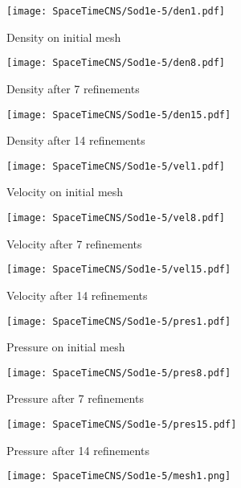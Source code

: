 \documentclass[Proposal.tex]{subfiles}
\begin{document}
\begin{figure}[p]
\centering
\begin{subfigure}[c]{0.3\textwidth}
\centering
\texttt{[image: SpaceTimeCNS/Sod1e-5/den1.pdf]}
\caption{Density on initial mesh}
\label{fig:sod_den0}
\end{subfigure}
\begin{subfigure}[c]{0.3\textwidth}
\centering
\texttt{[image: SpaceTimeCNS/Sod1e-5/den8.pdf]}
\caption{Density after 7 refinements}
\label{fig:sod_den7}
\end{subfigure}
\begin{subfigure}[c]{0.3\textwidth}
\centering
\texttt{[image: SpaceTimeCNS/Sod1e-5/den15.pdf]}
\caption{Density after 14 refinements}
\label{fig:sod_den14}
\end{subfigure}
\begin{subfigure}[c]{0.3\textwidth}
\centering
\texttt{[image: SpaceTimeCNS/Sod1e-5/vel1.pdf]}
\caption{Velocity on initial mesh}
\label{fig:sod_vel0}
\end{subfigure}
\begin{subfigure}[c]{0.3\textwidth}
\centering
\texttt{[image: SpaceTimeCNS/Sod1e-5/vel8.pdf]}
\caption{Velocity after 7 refinements}
\label{fig:sod_vel7}
\end{subfigure}
\begin{subfigure}[c]{0.3\textwidth}
\centering
\texttt{[image: SpaceTimeCNS/Sod1e-5/vel15.pdf]}
\caption{Velocity after 14 refinements}
\label{fig:sod_vel14}
\end{subfigure}
\begin{subfigure}[c]{0.3\textwidth}
\centering
\texttt{[image: SpaceTimeCNS/Sod1e-5/pres1.pdf]}
\caption{Pressure on initial mesh}
\label{fig:sod_pres0}
\end{subfigure}
\begin{subfigure}[c]{0.3\textwidth}
\centering
\texttt{[image: SpaceTimeCNS/Sod1e-5/pres8.pdf]}
\caption{Pressure after 7 refinements}
\label{fig:sod_pres7}
\end{subfigure}
\begin{subfigure}[c]{0.3\textwidth}
\centering
\texttt{[image: SpaceTimeCNS/Sod1e-5/pres15.pdf]}
\caption{Pressure after 14 refinements}
\label{fig:sod_pres14}
\end{subfigure}
\begin{subfigure}[c]{0.45\textwidth}
\centering
\texttt{[image: SpaceTimeCNS/Sod1e-5/mesh1.png]}

\end{subfigure}
\end{figure}
\end{document}
